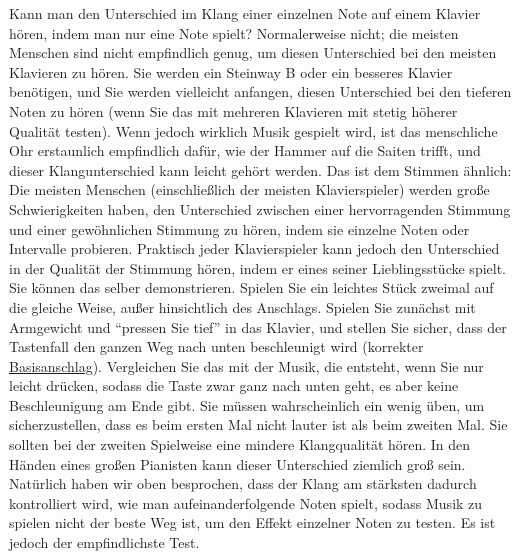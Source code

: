 Kann man den Unterschied im Klang einer einzelnen Note auf einem Klavier hören, indem man nur eine Note spielt?
Normalerweise nicht; die meisten Menschen sind nicht empfindlich genug, um diesen Unterschied bei den meisten Klavieren zu hören.
Sie werden ein Steinway B oder ein besseres Klavier benötigen, und Sie werden vielleicht anfangen, diesen Unterschied bei den tieferen Noten zu hören (wenn Sie das mit mehreren Klavieren mit stetig höherer Qualität testen).
Wenn jedoch wirklich Musik gespielt wird, ist das menschliche Ohr erstaunlich empfindlich dafür, wie der Hammer auf die Saiten trifft, und dieser Klangunterschied kann leicht gehört werden.
Das ist dem Stimmen ähnlich: Die meisten Menschen (einschließlich der meisten Klavierspieler) werden große Schwierigkeiten haben, den Unterschied zwischen einer hervorragenden Stimmung und einer gewöhnlichen Stimmung zu hören, indem sie einzelne Noten oder Intervalle probieren.
Praktisch jeder Klavierspieler kann jedoch den Unterschied in der Qualität der Stimmung hören, indem er eines seiner Lieblingsstücke spielt.
Sie können das selber demonstrieren.
Spielen Sie ein leichtes Stück zweimal auf die gleiche Weise, außer hinsichtlich des Anschlags.
Spielen Sie zunächst mit Armgewicht und \enquote{pressen Sie tief} in das Klavier, und stellen Sie sicher, dass der Tastenfall den ganzen Weg nach unten beschleunigt wird (korrekter \hyperref[c1iii1a1]{Basisanschlag}).
Vergleichen Sie das mit der Musik, die entsteht, wenn Sie nur leicht drücken, sodass die Taste zwar ganz nach unten geht, es aber keine Beschleunigung am Ende gibt.
Sie müssen wahrscheinlich ein wenig üben, um sicherzustellen, dass es beim ersten Mal nicht lauter ist als beim zweiten Mal.
Sie sollten bei der zweiten Spielweise eine mindere Klangqualität hören.
In den Händen eines großen Pianisten kann dieser Unterschied ziemlich groß sein.
Natürlich haben wir oben besprochen, dass der Klang am stärksten dadurch kontrolliert wird, wie man aufeinanderfolgende Noten spielt, sodass Musik zu spielen nicht der beste Weg ist, um den Effekt einzelner Noten zu testen.
Es ist jedoch der empfindlichste Test.

